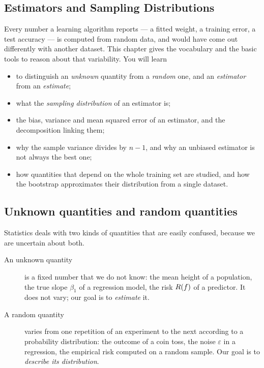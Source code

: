 \begin{notechapter}
\chapter{Estimators and Sampling Distributions}\label{ch:stats-and-proba}

\begin{chapterintro}
Every number a learning algorithm reports --- a fitted weight, a training error,
a test accuracy --- is computed from random data, and would have come out
differently with another dataset. This chapter gives the vocabulary and the
basic tools to reason about that variability. You will learn
\begin{itemize}[nosep]
  \item to distinguish an \emph{unknown} quantity from a \emph{random} one, and an
        \emph{estimator} from an \emph{estimate};
  \item what the \emph{sampling distribution} of an estimator is;
  \item the bias, variance and mean squared error of an estimator, and the
        decomposition linking them;
  \item why the sample variance divides by $n-1$, and why an unbiased estimator
        is not always the best one;
  \item how quantities that depend on the whole training set are studied, and
        how the bootstrap approximates their distribution from a single dataset.
\end{itemize}
\end{chapterintro}

\section{Unknown quantities and random quantities}\label{stats-and-proba:sec:unknown-random}

Statistics deals with two kinds of quantities that are easily confused,
because we are uncertain about both.

\begin{description}
  \item[An unknown quantity] is a fixed number that we do not know: the mean
        height of a population, the true slope $\beta_1$ of a regression model,
        the risk $R(f)$ of a predictor. It does not vary; our goal is to
        \emph{estimate} it.
  \item[A random quantity] varies from one repetition of an experiment to the
        next according to a probability distribution: the outcome of a coin
        toss, the noise $\varepsilon$ in a regression, the empirical risk
        computed on a random sample. Our goal is to \emph{describe its
        distribution}.
\end{description}


\end{notechapter}
